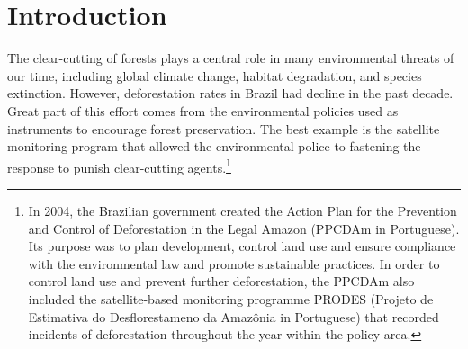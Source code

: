 \section{Introduction}
\label{S:1}
The clear-cutting of forests plays a central role in many environmental threats of our time, including global climate change, habitat degradation, and species extinction. However, deforestation rates in Brazil had decline in the past decade. Great part of this effort comes from the environmental policies used as instruments to encourage forest preservation. The best example is the satellite monitoring program that allowed the environmental police to fastening the response to punish clear-cutting agents.\footnote{In 2004, the Brazilian government created the Action Plan for the Prevention and Control of Deforestation in the Legal Amazon (PPCDAm in Portuguese). Its purpose was to plan development, control land use and ensure compliance with the environmental law and promote sustainable practices. In order to control land use and prevent further deforestation, the PPCDAm also included the satellite-based monitoring programme PRODES (Projeto de Estimativa do Desflorestameno da Amaz\^{o}nia in Portuguese) \citep{inpe} that recorded incidents of deforestation throughout the year within the policy area.} %


